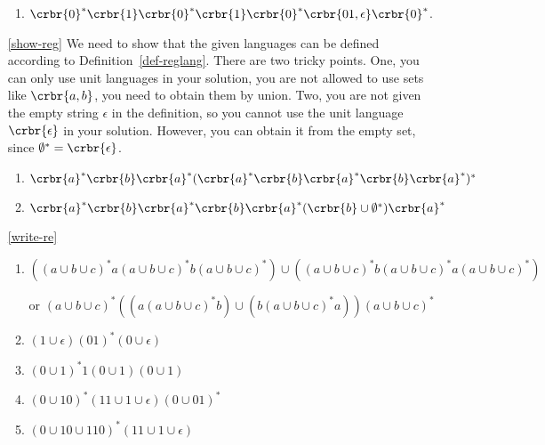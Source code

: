 \documentclass[11pt]{article}
\begin{document}
\begin{itemize}
\begin{enumerate}
\item $\crbr{0}^*\crbr{1}\crbr{0}^*\crbr{1}\crbr{0}^*\crbr{01,\epsilon}\crbr{0}^*$.

\end{enumerate}
\item[\ref{show-reg}] We need to show that the given languages can be defined
according to Definition~\ref{def-reglang}. There are two tricky points. One,
you can only use unit languages in your solution, you are not allowed to
use sets like $\crbr{a,b}$, you need to obtain them by union. Two,  you are not
given the empty string $\epsilon$ in the definition, so you cannot use the unit
language $\crbr{\epsilon}$  in your solution. However, you can obtain it from
the empty set, since $\emptyset^*=\crbr{\epsilon}$.

\begin{enumerate}
\item $\crbr{a}^*\crbr{b}\crbr{a}^*(\crbr{a}^*\crbr{b}\crbr{a}^*\crbr{b}\crbr{a}^*)^*$ 

\item $\crbr{a}^*\crbr{b}\crbr{a}^*\crbr{b}\crbr{a}^*(\crbr{b}\cup\emptyset^*)\crbr{a}^*$ 

\end{enumerate}


\item[\ref{write-re}]
\begin{enumerate}
\item $((a\cup b \cup c)^*a(a\cup b \cup c)^*b(a\cup b \cup c)^*) \cup ((a\cup b \cup c)^*b(a\cup b \cup c)^*a(a\cup b \cup c)^*)$

or $(a\cup b \cup c)^*((a(a\cup b \cup c)^*b) \cup (b(a\cup b \cup c)^*a))(a\cup b \cup c)^*$

\item $(1\cup\epsilon)(01)^*(0\cup\epsilon)$

\item $(0\cup 1)^*1(0\cup 1)(0\cup 1)$

\item $(0\cup 10)^*(11\cup 1\cup \epsilon)(0\cup 01)^*$

\item $(0\cup 10 \cup 110)^*(11\cup 1\cup \epsilon)$

\end{enumerate}
\end{itemize}
\end{document}
